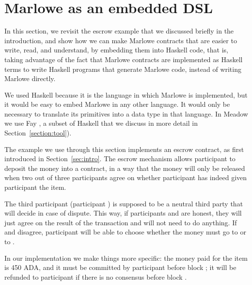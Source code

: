 \documentclass[runningheads]{llncs}
\begin{document}
\section{Marlowe as an embedded DSL}
\label{section:example-escrow}

In this section, we revisit the escrow example that we discussed briefly in the introduction, and show how we can make 
Marlowe contracts that are easier to write, read, and understand, by embedding them into Haskell code, that is, taking 
advantage of the fact that Marlowe contracts are implemented as Haskell terms to write Haskell programs that generate 
Marlowe code, instead of writing Marlowe directly.

We used Haskell because it is the language in which Marlowe is implemented, but it would be easy to embed Marlowe in any 
other language. It would only be necessary to translate its primitives into a data type in that language. In Meadow we 
use Fay \cite{Fay}, a subset of Haskell that we discuss in more detail in Section~\ref{section:tool}).

The example we use through this section implements an escrow contract, as first introduced in Section~\ref{sec:intro}. 
%
%
The escrow mechanism allows participant  to deposit the money into a contract, in a way that the money 
will only be released when two out of three participants agree on whether participant  has indeed given 
participant  the item. 

The third participant (participant ) is supposed to be a 
neutral third party that will decide in case of dispute.
This way, if participants  and  are honest, they will just agree on the result of the 
transaction and  will not need to do anything. If  and  disagree, 
participant  will be able to choose whether the money must go to  or to 
.

In our implementation we make things more specific: the money paid for the item is 450 ADA, and it must be committed by 
participant  before block ; it will be refunded to participant  if 
there is no consensus before block .
\end{document}
